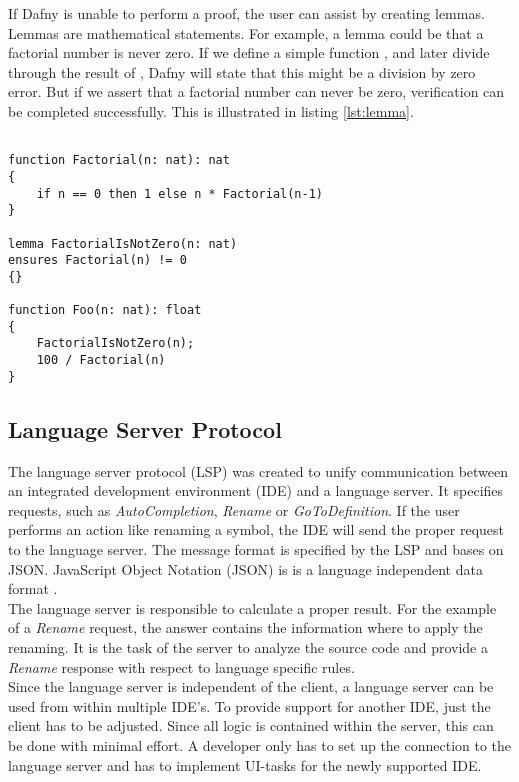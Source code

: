 If Dafny is unable to perform a proof, the user can assist by creating lemmas.
Lemmas are mathematical statements.
For example, a lemma could be that a factorial number is never zero.
If we define a simple function , and later divide through the result of , Dafny will state that this might be a division by zero error.
But if we assert that a factorial number can never be zero, verification can be completed successfully.
This is illustrated in listing \ref{lst:lemma}.
\begin{lstlisting}[language=dafny, caption={Lemma Example for Factorial}, captionpos=b, label={lst:lemma}]

function Factorial(n: nat): nat
{
    if n == 0 then 1 else n * Factorial(n-1)
}

lemma FactorialIsNotZero(n: nat)
ensures Factorial(n) != 0
{}

function Foo(n: nat): float
{
    FactorialIsNotZero(n);
    100 / Factorial(n)
}
\end{lstlisting}

\subsection{Language Server Protocol}
The language server protocol (LSP) was created to unify communication between an integrated development environment (IDE) and a language server. 
It specifies requests, such as \textit{AutoCompletion}, \textit{Rename} or \textit{GoToDefinition}.
If the user performs an action like renaming a symbol, the IDE will send the proper request to the language server.
The message format is specified by the LSP and bases on JSON. 
JavaScript Object Notation (JSON) is is a language independent data format \cite{json}. \\

The language server is responsible to calculate a proper result.
For the example of a \textit{Rename} request, the answer contains the information where to apply the renaming.
It is the task of the server to analyze the source code and provide a \textit{Rename} response with respect to language specific rules.\\

Since the language server is independent of the client, a language server can be used from within multiple IDE's.
To provide support for another IDE, just the client has to be adjusted.
Since all logic is contained within the server, this can be done with minimal effort.
A developer only has to set up the connection to the language server and has to implement UI-tasks for the newly supported IDE.

